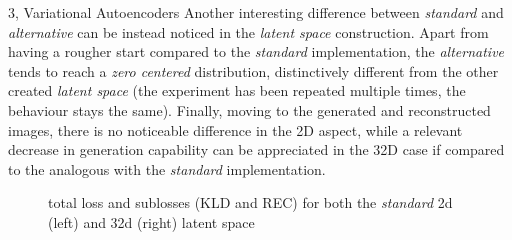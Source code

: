 \documentclass[10pt,a4paper]{article}
\begin{document}
\begin{task}{3, Variational Autoencoders}
Another interesting difference between \textit{standard} and \textit{alternative} can be instead noticed in the \textit{latent space} construction. Apart from having a rougher start compared to the \textit{standard} implementation, the \textit{alternative} tends to reach a \textit{zero centered} distribution, distinctively different from the other created \textit{latent space} (the experiment has been repeated multiple times, the behaviour stays the same). 
Finally, moving to the generated and reconstructed images, there is no noticeable difference in the 2D aspect, while a relevant decrease in generation capability can be appreciated in the 32D case if compared to the analogous with the \textit{standard} implementation.


\begin{figure}[t]\centering
{} \hspace{1.5cm}
\caption{total loss and sublosses (KLD and REC) for both the \textit{standard} 2d (left) and 32d (right) latent space}
\label{fig:loss-standard}
\end{figure}
\pagebreak 



\end{task}
\end{document}

